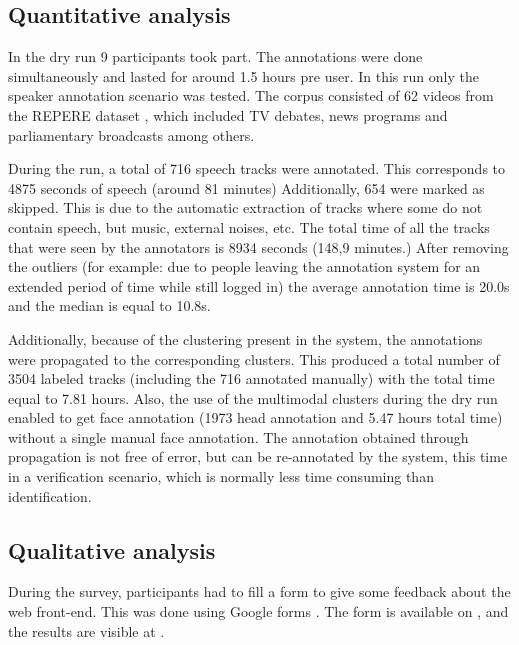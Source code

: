 \documentclass[a4paper]{article}
\begin{document}
      
      \subsection{Quantitative analysis}
 
 In the dry run 9 participants took part. The annotations were done simultaneously and lasted for around 1.5 hours pre user.
In this run only the speaker annotation scenario was tested. The corpus consisted of 62 videos from the REPERE dataset \cite{giraudel2012repere}, which included TV debates, news programs and parliamentary broadcasts among others.  

During the run, a total of 716 speech tracks were annotated. This corresponds to 4875 seconds of speech (around 81 minutes) Additionally, 654 were marked as skipped. This is due to the automatic extraction of tracks where some do not contain speech, but music, external noises, etc. The total time of all the tracks that were seen by the annotators is 8934 seconds (148,9 minutes.)
After removing the outliers (for example: due to people leaving the annotation system for an extended period of time while still logged in) the average annotation time is 20.0s and the median is equal to 10.8s.

Additionally, because of the clustering present in the system, the annotations were propagated to the corresponding clusters. This produced a total number of 3504 labeled tracks (including the 716 annotated manually) with the total time equal to 7.81 hours. Also, the use of the multimodal clusters during the dry run enabled to get face annotation (1973 head annotation and 5.47 hours total time)
without a single manual face annotation. The annotation obtained through propagation is not free of error, but can be re-annotated by the system, this time in a verification scenario, which is normally less time consuming than identification.


 
    

  
     \subsection{Qualitative analysis}
    

During the survey, participants had to fill a form to give some  feedback about the web front-end. This was done using Google forms \cite{url-google-forms}. The form is available on \cite{url-list-form}, and the results are visible at \cite{url-list-form-results}.
\end{document}
